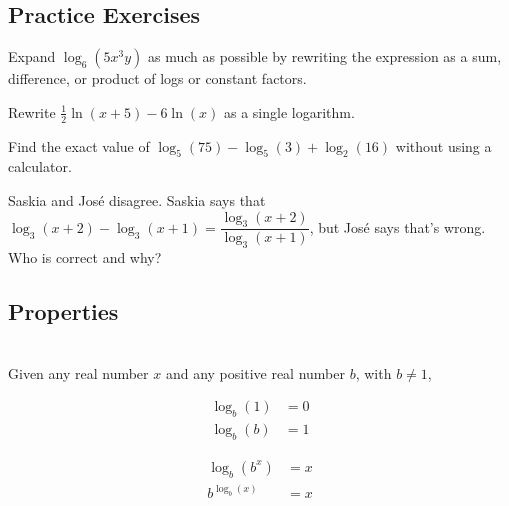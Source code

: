 


\newpage


\subsection*{Practice Exercises} \label{practice-logarithms-properties}
\begin{myPractice}
Expand $\log_6(5x^3y)$ as much as possible by rewriting the expression as a sum, difference, or product of logs or constant factors.
\end{myPractice}
\vfill

\begin{myPractice}
Rewrite $\frac{1}{2}\ln(x+5)-6\ln(x)$ as a single logarithm.
\end{myPractice}
\vfill

\begin{myPractice}
Find the exact value of $\log_{5}(75)-\log_{5}(3)+\log_2(16)$ without using a calculator.
\end{myPractice}
\vfill

\begin{myPractice}
Saskia and José disagree.  Saskia says that $\log_3(x+2)-\log_3(x+1) = \dfrac{\log_3(x+2)}{\log_3(x+1)}$, but José says that's wrong.  \\
Who is correct and why?
\end{myPractice}
\vfill






\newpage

\subsection*{Properties} \label{def-logarithms-properties}

\begin{myDefinition}~\\[0.5mm]
Given any real number $x$ and any positive real number $b$, with $b\neq 1$,\\[0.5em]
	\begin{minipage}{0.4\linewidth}
			$$\begin{aligned} 
			\log_b(1)&=0\\[0.5em]
			\log_b(b)&=1
			\end{aligned}$$
	\end{minipage}
	\begin{minipage}{0.4\linewidth}
			$$\begin{aligned} 
			\log_b(b^x)&=x\\[0.6em]
			b^{\log_b(x)}&=x
			\end{aligned}$$

	\end{minipage}
\end{myDefinition}


